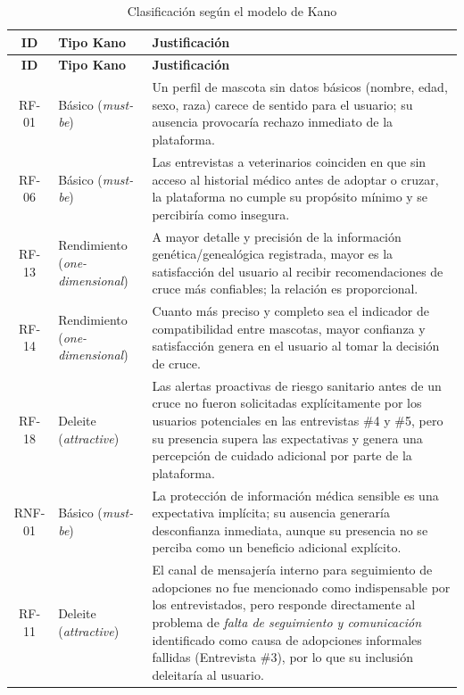 \begin{longtable}{|c|p{3.2cm}|p{9.3cm}|}
	\caption{Clasificación según el modelo de Kano}
	\label{tab:kano} \\
	\hline
	\textbf{ID} & \textbf{Tipo Kano} & \textbf{Justificación} \\ \hline
	\endfirsthead
	\hline
	\textbf{ID} & \textbf{Tipo Kano} & \textbf{Justificación} \\ \hline
	\endhead
	RF-01 & Básico (\textit{must-be}) & Un perfil de mascota sin datos básicos (nombre, edad, sexo, raza) carece de sentido para el usuario; su ausencia provocaría rechazo inmediato de la plataforma. \\ \hline
	RF-06 & Básico (\textit{must-be}) & Las entrevistas a veterinarios coinciden en que sin acceso al historial médico antes de adoptar o cruzar, la plataforma no cumple su propósito mínimo y se percibiría como insegura. \\ \hline
	RF-13 & Rendimiento (\textit{one-dimensional}) & A mayor detalle y precisión de la información genética/genealógica registrada, mayor es la satisfacción del usuario al recibir recomendaciones de cruce más confiables; la relación es proporcional. \\ \hline
	RF-14 & Rendimiento (\textit{one-dimensional}) & Cuanto más preciso y completo sea el indicador de compatibilidad entre mascotas, mayor confianza y satisfacción genera en el usuario al tomar la decisión de cruce. \\ \hline
	RF-18 & Deleite (\textit{attractive}) & Las alertas proactivas de riesgo sanitario antes de un cruce no fueron solicitadas explícitamente por los usuarios potenciales en las entrevistas \#4 y \#5, pero su presencia supera las expectativas y genera una percepción de cuidado adicional por parte de la plataforma. \\ \hline
	RNF-01 & Básico (\textit{must-be}) & La protección de información médica sensible es una expectativa implícita; su ausencia generaría desconfianza inmediata, aunque su presencia no se perciba como un beneficio adicional explícito. \\ \hline
	RF-11 & Deleite (\textit{attractive}) & El canal de mensajería interno para seguimiento de adopciones no fue mencionado como indispensable por los entrevistados, pero responde directamente al problema de \textit{falta de seguimiento y comunicación} identificado como causa de adopciones informales fallidas (Entrevista \#3), por lo que su inclusión deleitaría al usuario. \\ \hline
\end{longtable}

